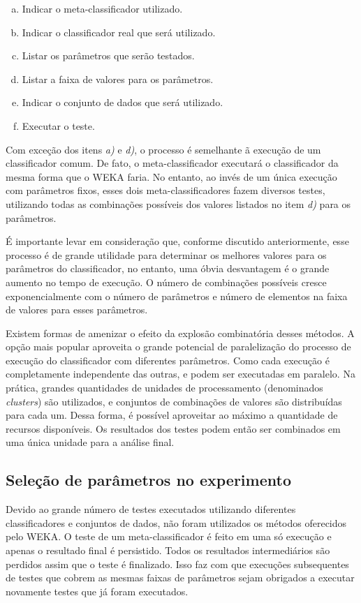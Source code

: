 \begin{enumerate}[a)]
    \item Indicar o meta-classificador utilizado.
    \item Indicar o classificador real que será utilizado.
    \item Listar os parâmetros que serão testados.
    \item Listar a faixa de valores para os parâmetros.
    \item Indicar o conjunto de dados que será utilizado.
    \item Executar o teste.
\end{enumerate}

Com exceção dos itens \emph{a)} e \emph{d)}, o processo é semelhante ã execução de um classificador comum. De fato, o meta-classificador executará o classificador da mesma forma que o WEKA faria. No entanto, ao invés de um única execução com parâmetros fixos, esses dois meta-classificadores fazem diversos testes, utilizando todas as combinações possíveis dos valores listados no item \emph{d)} para os parâmetros.

É importante levar em consideração que, conforme discutido anteriormente, esse processo é de grande utilidade para determinar os melhores valores para os parâmetros do classificador, no entanto, uma óbvia desvantagem é o grande aumento no tempo de execução. O número de combinações possíveis cresce exponencialmente com o número de parâmetros e número de elementos na faixa de valores para esses parâmetros.

Existem formas de amenizar o efeito da explosão combinatória desses métodos. A opção mais popular aproveita o grande potencial de paralelização do processo de execução do classificador com diferentes parâmetros. Como cada execução é completamente independente das outras, e podem ser executadas em paralelo. Na prática, grandes quantidades de unidades de processamento (denominados \emph{clusters}) são utilizados, e conjuntos de combinações de valores são distribuídas para cada um. Dessa forma, é possível aproveitar ao máximo a quantidade de recursos disponíveis. Os resultados dos testes podem então ser combinados em uma única unidade para a análise final.

\subsection{Seleção de parâmetros no experimento}

Devido ao grande número de testes executados utilizando diferentes classificadores e conjuntos de dados, não foram utilizados os métodos oferecidos pelo WEKA. O teste de um meta-classificador é feito em uma só execução e apenas o resultado final é persistido. Todos os resultados intermediários são perdidos assim que o teste é finalizado. Isso faz com que execuções subsequentes de testes que cobrem as mesmas faixas de parâmetros sejam obrigados a executar novamente testes que já foram executados.

